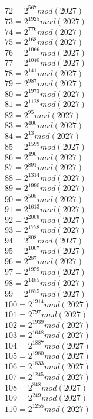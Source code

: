 \documentclass[12pt, letterpaper]{article}
\begin{document}
\begin{itemize}
\begin{multicols}{3}
$72= 2^{567} mod (2027)$\\
$73= 2^{1925} mod (2027)$\\
$74= 2^{776} mod (2027)$\\
$75= 2^{168} mod (2027)$\\
$76= 2^{1066} mod (2027)$\\
$77= 2^{1040} mod (2027)$\\
$78= 2^{141} mod (2027)$\\
$79= 2^{987} mod (2027)$\\
$80= 2^{1973} mod (2027)$\\
$81= 2^{1128} mod (2027)$\\
$82= 2^{95} mod (2027)$\\
$83= 2^{400} mod (2027)$\\
$84= 2^{13} mod (2027)$\\
$85= 2^{1599} mod (2027)$\\
$86= 2^{490} mod (2027)$\\
$87= 2^{891} mod (2027)$\\
$88= 2^{1314} mod (2027)$\\
$89= 2^{1990} mod (2027)$\\
$90= 2^{508} mod (2027)$\\
$91= 2^{1613} mod (2027)$\\
$92= 2^{2009} mod (2027)$\\
$93= 2^{1778} mod (2027)$\\
$94= 2^{808} mod (2027)$\\
$95= 2^{1007} mod (2027)$\\
$96= 2^{287} mod (2027)$\\
$97= 2^{1959} mod (2027)$\\
$98= 2^{1485} mod (2027)$\\
$99= 2^{1875} mod (2027)$\\
$100= 2^{1914} mod (2027)$\\
$101= 2^{797} mod (2027)$\\
$102= 2^{1939} mod (2027)$\\
$103= 2^{1648} mod (2027)$\\
$104= 2^{1887} mod (2027)$\\
$105= 2^{1980} mod (2027)$\\
$106= 2^{1833} mod (2027)$\\
$107= 2^{1245} mod (2027)$\\
$108= 2^{848} mod (2027)$\\
$109= 2^{249} mod (2027)$\\
$110= 2^{1255} mod (2027)$\\

\end{multicols}
\end{itemize}
\end{document}
